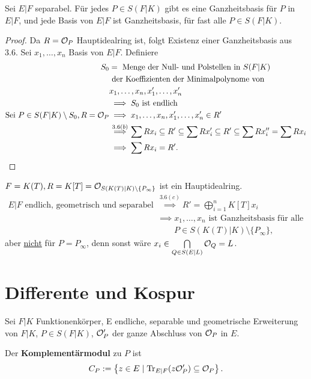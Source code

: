\begin{satz}
    Sei $E|F$ separabel. Für jedes $P\in S(F|K)$ gibt es eine Ganzheitsbasis für $P$ in $E|F$, und jede Basis von $E|F$ ist Ganzheitsbasis,
    für fast alle $P\in S(F|K)$.
\end{satz}
\begin{proof}
    Da $R=\mathcal{O}_P$ Hauptidealring ist, folgt Existenz einer Ganzheitsbasis aus 3.6. Sei $x_1,\ldots,x_n$ Basis von $E|F$.
    Definiere 
    \begin{align*}
        S_0 & = \text{ Menge der Null- und Polstellen in } S(F|K)\\ 
        &\text{ der Koeffizienten der Minimalpolynome von } \\
        &x_1,\ldots,x_n,x'_1,\ldots,x'_n\\
        & \implies S_0 \text{ ist endlich}\\
        \text{Sei } P\in S(F|K)\setminus S_0, R = \mathcal{O}_P & \implies x_1,\ldots,x_n,x'_1,\ldots,x'_n \in R'\\
        & \stackrel{3.6(b)}{\implies} \sum Rx_i \subseteq R' \subseteq \sum Rx'_i \subseteq R' \subseteq \sum Rx''_i = \sum Rx_i\\
        & \implies \sum Rx_i = R'.
    \end{align*}
\end{proof}

\begin{beispiel}
    $F=K(T), R=K[T]=\mathcal{O}_{S(K(T)|K)\setminus\{P_\infty\}}$ ist ein Hauptidealring.
    \begin{align*}
        E|F \text{ endlich, geometrisch und separabel } & \stackrel{3.6(c)}{\implies} R' = \bigoplus\limits_{i=1}^n K[T]x_i\\
        & \implies x_1,\ldots,x_n \text{ ist Ganzheitsbasis für alle } \\&\qquad P \in S(K(T)|K)\setminus\{P_\infty\},
    \end{align*}
    aber \underline{nicht} für $P=P_\infty$, denn sonst wäre $x_i \in \bigcap\limits_{Q \in S(E|L)} \mathcal{O}_Q = L$.
\end{beispiel}

\section{Differente und Kospur}
Sei $F|K$ Funktionenkörper, E endliche, separable und geometrische Erweiterung von $F|K$,
$P \in S(F|K)$, $\mathcal{O}'_P$ der ganze Abschluss von $\mathcal{O}_P$ in $E$.

\begin{definition}
    Der \textbf{Komplementärmodul} zu $P$ ist
    $$ C_P := \left\{z \in E \mid \operatorname{Tr}_{E|F}(z\mathcal{O}'_P)\subseteq\mathcal{O}_P\right\}.$$
\end{definition}

